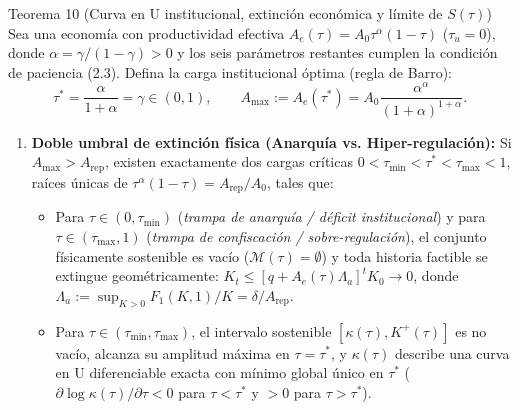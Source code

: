 \documentclass[11pt,letterpaper]{article}
\theoremstyle{plain}
\newtheorem*{namedthm}{\protect\namedthmname}
\newcommand{\namedthmname}{}
\newenvironment{thm_box}[1]{\renewcommand{\namedthmname}{#1}\begin{namedthm}}{\end{namedthm}}
\begin{document}
\begin{thm_box}{Teorema 10 (Curva en U institucional, extinción económica y límite de $S(\tau)$)}
Sea una economía con productividad efectiva $A_e(\tau)=A_0\tau^\alpha(1-\tau)$ ($\tau_u=0$), donde $\alpha=\gamma/(1-\gamma)>0$ y los seis parámetros restantes cumplen la condición de paciencia (2.3). Defina la carga institucional óptima (regla de Barro):
\[
\tau^* = \frac{\alpha}{1+\alpha} = \gamma \in (0,1), \qquad A_{\max} := A_e(\tau^*) = A_0 \frac{\alpha^\alpha}{(1+\alpha)^{1+\alpha}}.
\]
\begin{enumerate}
\item \textbf{Doble umbral de extinción física (Anarquía vs. Hiper-regulación):} Si $A_{\max}>A_{\mathrm{rep}}$, existen exactamente dos cargas críticas $0<\tau_{\min}<\tau^*<\tau_{\max}<1$, raíces únicas de $\tau^\alpha(1-\tau)=A_{\mathrm{rep}}/A_0$, tales que:
\begin{itemize}
\item Para $\tau\in(0,\tau_{\min})$ (\emph{trampa de anarquía / déficit institucional}) y para $\tau\in(\tau_{\max},1)$ (\emph{trampa de confiscación / sobre-regulación}), el conjunto físicamente sostenible es vacío ($\mathcal{M}(\tau)=\emptyset$) y toda historia factible se extingue geométricamente: $K_t\le [q+A_e(\tau)\Lambda_a]^t K_0 \to 0$, donde $\Lambda_a := \sup_{K>0} F_1(K,1)/K = \delta/A_{\mathrm{rep}}$.
\item Para $\tau\in(\tau_{\min},\tau_{\max})$, el intervalo sostenible $[\kappa(\tau),K^+(\tau)]$ es no vacío, alcanza su amplitud máxima en $\tau=\tau^*$, y $\kappa(\tau)$ describe una curva en U diferenciable exacta con mínimo global único en $\tau^*$ ($\partial\log\kappa(\tau)/\partial\tau < 0$ para $\tau<\tau^*$ y $>0$ para $\tau>\tau^*$).
\end{itemize}

\end{enumerate}
\end{thm_box}
\end{document}
